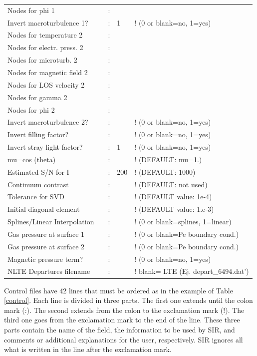 \documentclass[11pt]{report}
\begin{document}
\begin{table}
\begin{tabular}{lrcll}
Nodes for phi 1            &  &:&     &          \\
Invert macroturbulence 1?  &  &:&1    &        ! (0 or blank=no, 1=yes)\\
Nodes for temperature 2    &  &:&     &          \\
Nodes for electr. press. 2 &  &:&     &                \\
Nodes for microturb. 2     &  &:&     &              \\
Nodes for magnetic field 2 &  &:&     &\\
Nodes for LOS velocity 2   &  &:&     &         \\
Nodes for gamma 2          &  &:&     &          \\
Nodes for phi 2            &  &:&     &          \\
Invert macroturbulence 2?  &  &:&     &        ! (0 or blank=no, 1=yes)\\
Invert filling factor?     &  &:&     &        ! (0 or blank=no, 1=yes)\\
Invert stray light factor? &  &:&1    &        ! (0 or blank=no, 1=yes)\\
mu=cos (theta)              & &:&     &        ! (DEFAULT: mu=1.)\\
Estimated S/N for I         & &:&200  &        ! (DEFAULT: 1000) \\
Continuum contrast          & &:&     &        ! (DEFAULT: not used)\\
Tolerance for SVD           & &:&     &        ! (DEFAULT value: 1e-4)\\
Initial diagonal element    & &:&     &        ! (DEFAULT value: 1.e-3) \\
Splines/Linear Interpolation& &:&     &        ! (0 or blank=splines, 1=linear) \\
Gas pressure at surface 1   & &:&     &        ! (0 or blank=Pe boundary cond.) \\
Gas pressure at surface 2   & &:&     &        ! (0 or blank=Pe boundary cond.) \\
Magnetic pressure term?     & &:&     &        ! (0 or blank=no, 1=yes) \\
NLTE Departures filename    & &:&     &        ! blank= LTE (Ej. depart\_6494.dat') \\
\end{tabular}
\end{table}

Control files have 42 lines that must be ordered as in the example of
Table \ref{control}. Each line is divided in three parts. The first one
extends until the colon mark (:). The second extends from the colon to
the exclamation mark (!). The third one goes from the exclamation mark
to the end of the line. These three parts contain the name of the field, the
information to be used by SIR, and comments or additional explanations
for the user, respectively. SIR ignores all what is written in the line 
after the exclamation mark.
\end{document}
